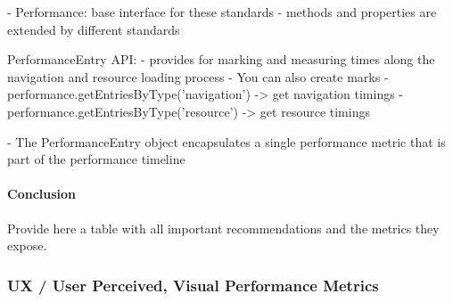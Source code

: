- Performance: base interface for these standards
- methods and properties are extended by different standards


PerformanceEntry API:
- provides for marking and measuring times along the navigation and resource loading process
- You can also create marks
- performance.getEntriesByType('navigation') -> get navigation timings
- performance.getEntriesByType('resource') -> get resource timings


- The PerformanceEntry object encapsulates a single performance metric that is part of the performance timeline














\paragraph{Conclusion}


Provide here a table with all important recommendations and the metrics they expose.










\subsubsection{UX / User Perceived, Visual Performance Metrics}









